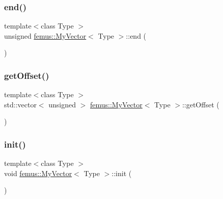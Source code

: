\mbox{\label{classfemus_1_1_my_vector_a35731f7bde0f48902b1bfbeff9d87016}} 
\subsubsection{\texorpdfstring{end()}{end()}}
{\footnotesize\ttfamily template$<$class Type $>$ \\
unsigned \mbox{\hyperlink{classfemus_1_1_my_vector}{femus\+::\+My\+Vector}}$<$ Type $>$\+::end (\begin{DoxyParamCaption}{ }\end{DoxyParamCaption})}

\mbox{\label{classfemus_1_1_my_vector_af5f6f37dbe0eb396f3c67d7addd66028}} 
\subsubsection{\texorpdfstring{get\+Offset()}{getOffset()}}
{\footnotesize\ttfamily template$<$class Type $>$ \\
std\+::vector$<$ unsigned $>$ \mbox{\hyperlink{classfemus_1_1_my_vector}{femus\+::\+My\+Vector}}$<$ Type $>$\+::get\+Offset (\begin{DoxyParamCaption}{ }\end{DoxyParamCaption})}

\mbox{\label{classfemus_1_1_my_vector_a6b978e8662f316acc89686030bcfcfb6}} 
\subsubsection{\texorpdfstring{init()}{init()}}
{\footnotesize\ttfamily template$<$class Type $>$ \\
void \mbox{\hyperlink{classfemus_1_1_my_vector}{femus\+::\+My\+Vector}}$<$ Type $>$\+::init (\begin{DoxyParamCaption}{ }\end{DoxyParamCaption})}

